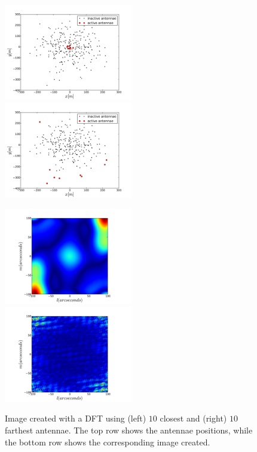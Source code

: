 \documentclass[11pt,letterpaper]{article}
\begin{document}
\begin{figure}[!h]
\centerline{
\includegraphics[width=0.5\textwidth]{10_closestantennae.pdf}
\includegraphics[width=0.5\textwidth]{10_farthestantennae.pdf}
}
\centerline{
\includegraphics[width=0.5\textwidth]{DFT_image_10closest.pdf}
\includegraphics[width=0.5\textwidth]{DFT_image_10farthest.pdf}
}
\caption{Image created with a DFT using (left) $10$ closest and (right) $10$ farthest antennae. The top row shows the antennae positions, while the bottom row shows the corresponding image created.}
\label{fig:dft_results}
\end{figure}
\end{document}
